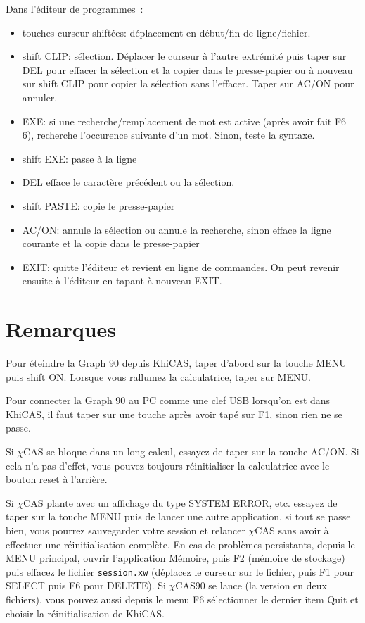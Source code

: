 \documentclass{article}
\begin{document}
\begin{giacjshere}
Dans l'\'editeur de programmes~:
\begin{itemize}
\item touches curseur shift\'ees: d\'eplacement en d\'ebut/fin de ligne/fichier.
\item shift CLIP: s\'election. D\'eplacer le curseur \`a l'autre
extr\'emit\'e puis taper sur DEL pour effacer la s\'election
et la copier dans le presse-papier ou \`a nouveau sur
shift CLIP pour copier la s\'election sans l'effacer.
Taper sur AC/ON pour annuler.
\item EXE: si une recherche/remplacement
de mot est active (apr\`es avoir fait F6 6),
recherche l'occurence suivante d'un mot. Sinon, teste la syntaxe.
\item shift EXE: passe \`a la ligne
\item DEL efface le caract\`ere pr\'ec\'edent ou la s\'election.
\item shift PASTE: copie le presse-papier
\item AC/ON: annule la s\'election ou annule la recherche, sinon
efface la ligne courante et la copie dans le presse-papier
\item EXIT: quitte l'\'editeur et revient en ligne de commandes. On
peut revenir ensuite \`a l'\'editeur en tapant \`a nouveau EXIT.
\end{itemize}

\section{Remarques}
Pour \'eteindre la Graph 90 depuis KhiCAS, taper d'abord 
sur la touche MENU puis shift ON. Lorsque vous rallumez la
calculatrice, taper sur MENU.

Pour connecter la Graph 90 au PC comme une clef USB lorsqu'on
est dans KhiCAS, il faut 
taper sur une touche  apr\`es avoir tap\'e sur F1, sinon
rien ne se passe.

Si $\chi$CAS se bloque dans un long calcul, essayez de taper sur la
touche AC/ON. Si cela n'a pas d'effet, vous pouvez toujours
r\'einitialiser la calculatrice avec le bouton reset \`a l'arri\`ere.

Si $\chi$CAS plante avec un affichage du type SYSTEM ERROR, etc.
essayez de taper sur la touche MENU puis de lancer une autre application,
si tout se passe bien, vous pourrez sauvegarder votre session et
relancer $\chi$CAS sans avoir \`a effectuer une r\'einitialisation
compl\`ete. En cas de probl\`emes persistants, 
depuis le MENU principal, ouvrir l'application M\'emoire, puis F2
(m\'emoire de stockage) puis effacez le fichier \verb|session.xw|
(d\'eplacez le curseur sur le fichier, puis F1 pour SELECT puis
F6 pour DELETE). Si $\chi$CAS90 se lance (la version en deux fichiers), 
vous pouvez aussi  depuis le menu F6 s\'electionner le dernier item 
Quit et choisir la r\'einitialisation de KhiCAS.


\end{giacjshere}
\end{document}
